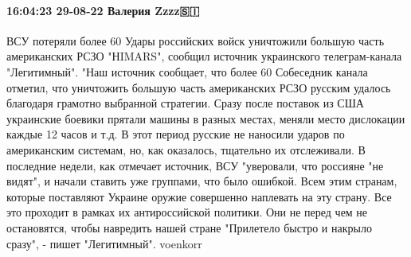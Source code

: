  
 
 
 
 

\paragraph{16:04:23 29-08-22 Валерия Zzzz🇸🇮}

ВСУ потеряли более 60%
Удары российских войск уничтожили большую часть американских РСЗО "НIMARS", сообщил источник украинского телеграм-канала "Легитимный".
"Наш источник сообщает, что более 60%
Собеседник канала отметил, что уничтожить большую часть американских РСЗО русским удалось благодаря грамотно выбранной стратегии.
Сразу после поставок из США украинские боевики прятали машины в разных местах, меняли место дислокации каждые 12 часов и т.д. В этот период русские не наносили ударов по американским системам, но, как оказалось, тщательно их отслеживали.
В последние недели, как отмечает источник, ВСУ "уверовали, что россияне "не видят", и начали ставить уже группами, что было ошибкой.
Всем этим странам, которые поставляют Украине оружие совершенно наплевать на эту страну. Все это проходит в рамках их антироссийской политики. Они не перед чем не остановятся, чтобы навредить нашей стране
"Прилетело быстро и накрыло сразу",
- пишет "Легитимный".
voenkorr
